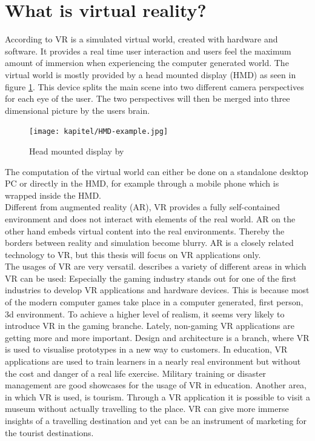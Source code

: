 \section{What is virtual reality?}
According to \cite{Fuchs.2011} VR is a simulated virtual world, created with hardware and software. It provides a real time user interaction and users feel the maximum amount of immersion when experiencing the computer generated world. The virtual world is mostly provided by a head mounted display (HMD) as seen in figure \ref{fig:hmd}. This device splits the main scene into two different camera perspectives for each eye of the user. The two perspectives will then be merged into three dimensional picture by the users brain. \\
\begin{figure}[h!]
  \texttt{[image: kapitel/HMD-example.jpg]}
  \centering
  \caption{Head mounted display by}
  \label{fig:hmd}
\end{figure}
The computation of the virtual world can either be done on a standalone desktop PC or directly in the HMD, for example through a mobile phone which is wrapped inside the HMD.\\
Different from augmented reality (AR), VR provides a fully self-contained environment and does not interact with elements of the real world. AR on the other hand embeds virtual content into the real environments. Thereby the borders between reality and simulation become blurry. AR is a closely related technology to VR, but this thesis will focus on VR applications only.\\
The usages of VR are very versatil. \cite{Linowes.2015} describes a variety of different areas in which VR can be used: Especially the gaming industry stands out for one of the first industries to develop VR applications and hardware devices. This is because most of the modern computer games take place in a computer generated, first person, 3d environment. To achieve a higher level of realism, it seems very likely to introduce VR in the gaming branche. Lately, non-gaming VR applications are getting more and more important. Design and architecture is a branch, where VR is used to visualise prototypes in a new way to customers. In education, VR applications are used to train learners in a nearly real environment but without the cost and danger of a real life exercise. Military training or disaster management are good showcases for the usage of VR in education. Another area, in which VR is used, is tourism. Through a VR application it is possible to visit a museum without actually travelling to the place. VR can give more immerse insights of a travelling destination and yet can be an instrument of marketing for the tourist destinations.
